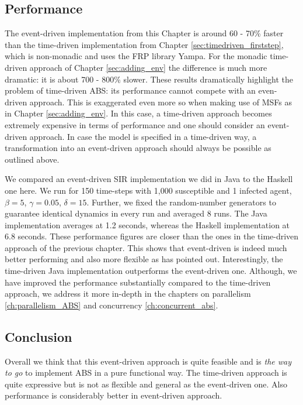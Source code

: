 \subsection{Performance}
The event-driven implementation from this Chapter is around 60 - 70\% faster than the time-driven implementation from Chapter \ref{sec:timedriven_firststep}, which is non-monadic and uses the FRP library Yampa. For the monadic time-driven approach of Chapter \ref{sec:adding_env} the difference is much more dramatic: it is about 700 - 800\% slower. These results dramatically highlight the problem of time-driven ABS: its performance cannot compete with an even-driven approach. This is exaggerated even more so when making use of MSFs as in Chapter \ref{sec:adding_env}. In this case, a time-driven approach becomes extremely expensive in terms of performance and one should consider an event-driven approach. In case the model is specified in a time-driven way, a transformation into an event-driven approach should always be possible as outlined above.

We compared an event-driven SIR implementation we did in Java to the Haskell one here. We run for 150 time-steps with 1,000 susceptible and 1 infected agent, $\beta = 5$, $\gamma = 0.05$, $\delta = 15$. Further, we fixed the random-number generators to guarantee identical dynamics in every run and averaged 8 runs. The Java implementation averages at 1.2 seconds, whereas the Haskell implementation at 6.8 seconds. These performance figures are closer than the ones in the time-driven approach of the previous chapter. This shows that event-driven is indeed much better performing and also more flexible as \cite{meyer_event-driven_2014} has pointed out. Interestingly, the time-driven Java implementation outperforms the event-driven one. Although, we have improved the performance substantially compared to the time-driven approach, we address it more in-depth in the chapters on parallelism \ref{ch:parallelism_ABS} and concurrency \ref{ch:concurrent_abs}.


\subsection{Conclusion}
Overall we think that this event-driven approach is quite feasible and is \textit{the way to go} to implement ABS in a pure functional way. The time-driven approach is quite expressive but is not as flexible and general as the event-driven one. Also performance is considerably better in event-driven approach.


